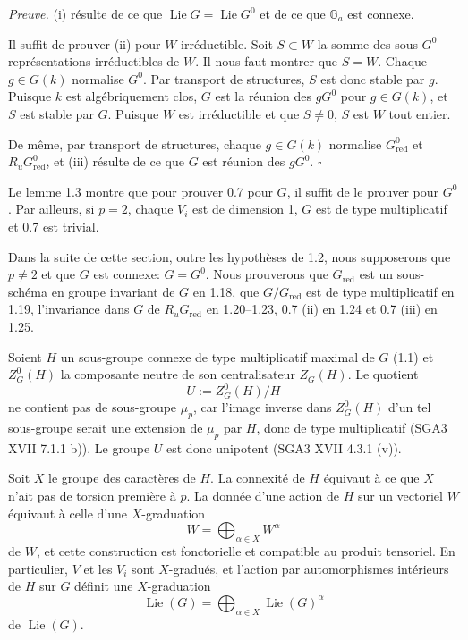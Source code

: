 \documentclass[10pt]{article}
\newcommand{\Ga}{\mathbb G_a}
\newcommand{\Lie}{\operatorname{Lie}}
\newcommand{\Ru}{R_u}
\newcommand{\red}{\mathrm{red}}
\theoremstyle{deligne}
\newenvironment{proofdel}{\textit{Preuve.}}{\hfill$\square$}
\newcommand{\heading}[1]{\vspace{0.7em}\noindent{\bfseries #1}\quad}
\begin{document}
\begin{proofdel}
(i) résulte de ce que \(\Lie G=\Lie G^0\) et de ce que \(\Ga\) est connexe.

Il suffit de prouver (ii) pour \(W\) irréductible. Soit \(S\subset W\) la somme des sous-\(G^0\)-représentations irréductibles de \(W\). Il nous faut montrer que \(S=W\). Chaque \(g\in G(k)\) normalise \(G^0\). Par transport de structures, \(S\) est donc stable par \(g\). Puisque \(k\) est algébriquement clos, \(G\) est la réunion des \(gG^0\) pour \(g\in G(k)\), et \(S\) est stable par \(G\). Puisque \(W\) est irréductible et que \(S\ne0\), \(S\) est \(W\) tout entier.

De même, par transport de structures, chaque \(g\in G(k)\) normalise \(G^0_{\red}\) et \(\Ru G^0_{\red}\), et (iii) résulte de ce que \(G\) est réunion des \(gG^0\).
\end{proofdel}

\heading{1.4.} Le lemme 1.3 montre que pour prouver 0.7 pour \(G\), il suffit de le prouver pour \(G^0\). Par ailleurs, si \(p=2\), chaque \(V_i\) est de dimension 1, \(G\) est de type multiplicatif et 0.7 est trivial.

Dans la suite de cette section, outre les hypothèses de 1.2, nous supposerons que \(p\ne2\) et que \(G\) est connexe: \(G=G^0\). Nous prouverons que \(G_{\red}\) est un sous-schéma en groupe invariant de \(G\) en 1.18, que \(G/G_{\red}\) est de type multiplicatif en 1.19, l'invariance dans \(G\) de \(\Ru G_{\red}\) en 1.20--1.23, 0.7 (ii) en 1.24 et 0.7 (iii) en 1.25.

\heading{1.5.} Soient \(H\) un sous-groupe connexe de type multiplicatif maximal de \(G\) (1.1) et \(Z^0_G(H)\) la composante neutre de son centralisateur \(Z_G(H)\). Le quotient
\[
  U:=Z^0_G(H)/H
\]
ne contient pas de sous-groupe \(\mu_p\), car l'image inverse dans \(Z^0_G(H)\) d'un tel sous-groupe serait une extension de \(\mu_p\) par \(H\), donc de type multiplicatif (SGA3 XVII 7.1.1 b)). Le groupe \(U\) est donc unipotent (SGA3 XVII 4.3.1 (v)).

\heading{1.6.} Soit \(X\) le groupe des caractères de \(H\). La connexité de \(H\) équivaut à ce que \(X\) n'ait pas de torsion première à \(p\). La donnée d'une action de \(H\) sur un vectoriel \(W\) équivaut à celle d'une \(X\)-graduation
\[
  W=\bigoplus_{\alpha\in X}W^\alpha
\]
de \(W\), et cette construction est fonctorielle et compatible au produit tensoriel. En particulier, \(V\) et les \(V_i\) sont \(X\)-gradués, et l'action par automorphismes intérieurs de \(H\) sur \(G\) définit une \(X\)-graduation
\[
  \Lie(G)=\bigoplus_{\alpha\in X}\Lie(G)^\alpha
\]
de \(\Lie(G)\).
\end{document}
